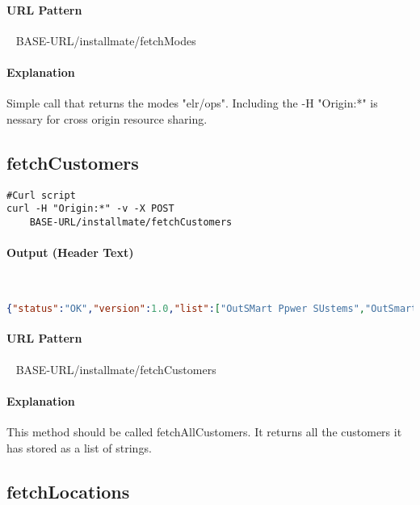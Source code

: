 \documentclass[
10pt, %
letterpaper, %
oneside, %
headinclude,footinclude, %
BCOR5mm, %
]{scrartcl}
\begin{document}
\paragraph{URL Pattern} 
~\newline
BASE-URL/installmate/fetchModes

\paragraph{Explanation} Simple call that returns the modes "elr/ops". Including the -H "Origin:*" is nessary for cross origin resource sharing. 



\subsection{\textbf{fetchCustomers}}

\begin{lstlisting}
#Curl script
curl -H "Origin:*" -v -X POST 
	BASE-URL/installmate/fetchCustomers
\end{lstlisting}

\paragraph{Output (Header Text)}~
\begin{lstlisting}[language=json]
{"status":"OK","version":1.0,"list":["OutSMart Ppwer SUstems","OutSmart Power Systems","laber"]}
\end{lstlisting}

\paragraph{URL Pattern} 
~\newline
BASE-URL/installmate/fetchCustomers

\paragraph{Explanation} This method should be called fetchAllCustomers. It returns all the customers it has stored as a list of strings.



\subsection{\textbf{fetchLocations}}
\end{document}
